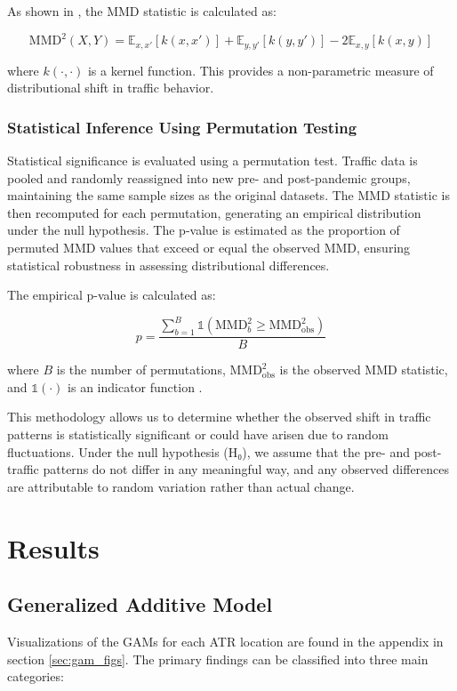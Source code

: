\documentclass{article}
\begin{document}
As shown in \cite{Gretton2019}, the MMD statistic is calculated as:

\[
\text{MMD}^2(X, Y) = \mathbb{E}_{x,x'}[k(x, x')] + \mathbb{E}_{y,y'}[k(y, y')] - 2\mathbb{E}_{x,y}[k(x, y)]
\]

where \( k(\cdot, \cdot) \) is a kernel function. This provides a non-parametric measure of distributional shift in traffic behavior.

\subsubsection{Statistical Inference Using Permutation Testing}

Statistical significance is evaluated using a permutation test. Traffic data is pooled and randomly reassigned into new pre- and post-pandemic groups, maintaining the same sample sizes as the original datasets. The MMD statistic is then recomputed for each permutation, generating an empirical distribution under the null hypothesis. The p-value is estimated as the proportion of permuted MMD values that exceed or equal the observed MMD, ensuring statistical robustness in assessing distributional differences.

The empirical p-value is calculated as:

\[
    p = \frac{\sum_{b=1}^{B} \boldsymbol{\mathbb{1}}(\text{MMD}^2_b \geq \text{MMD}^2_{\text{obs}})}{B}
\]

where \( B \) is the number of permutations, \( \text{MMD}^2_{\text{obs}} \) is the observed MMD statistic, and \( \mathbb{1}(\cdot) \) is an indicator function \cite{Gretton2012}.

This methodology allows us to determine whether the observed shift in traffic patterns is statistically significant or could have arisen due to random fluctuations. Under the null hypothesis (H₀), we assume that the pre- and post- traffic patterns do not differ in any meaningful way, and any observed differences are attributable to random variation rather than actual change.

\section{Results}

\subsection{Generalized Additive Model}

Visualizations of the GAMs for each ATR location are found in the appendix in section \ref{sec:gam_figs}. The primary findings can be classified into three main categories:
\end{document}

